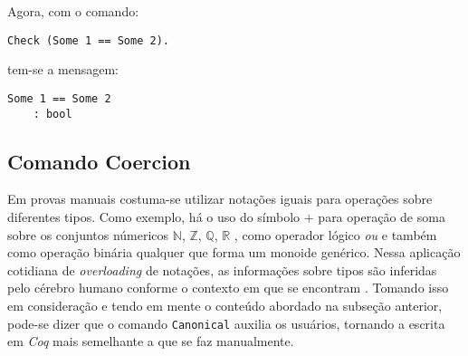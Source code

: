 Agora, com o comando:
    \begin{lstlisting}[language = coq,frame=single,tabsize=1]
Check (Some 1 == Some 2).
    \end{lstlisting}
tem-se a mensagem:
    \begin{lstlisting}[language = coq-error,frame=single,tabsize=1]
Some 1 == Some 2
    : bool
    \end{lstlisting}

\subsection{Comando Coercion} \label{subsection:coercion}

Em provas manuais costuma-se utilizar notações iguais para operações sobre diferentes tipos. Como exemplo, há o uso do símbolo $+$ para operação de soma sobre os conjuntos númericos $\mathbb{N}$, $\mathbb{Z}$, $\mathbb{Q}$, $\mathbb{R}$ , como operador lógico \textit{ou} e também como operação binária qualquer que forma um monoide genérico. Nessa aplicação cotidiana de \textit{overloading} de notações, as informações sobre tipos são inferidas pelo cérebro humano conforme o contexto em que se encontram \cite{10.1007/978-3-642-39634-2_5}. 
Tomando isso em consideração e tendo em mente o conteúdo abordado na subseção anterior, pode-se dizer que o comando \lstinline[language = coq]$Canonical$ auxilia os usuários, tornando a escrita em \textit{Coq} mais semelhante a que se faz manualmente.

